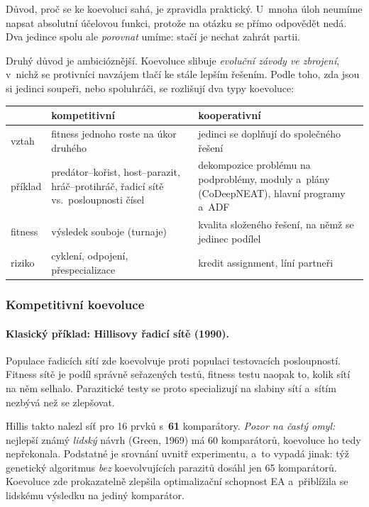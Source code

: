 \documentclass[11pt,a4paper]{article}
\theoremstyle{definition}
\begin{document}
Důvod, proč se ke koevoluci sahá, je zpravidla praktický. U~mnoha úloh neumíme napsat
absolutní účelovou funkci, protože na otázku  se přímo
odpovědět nedá. Dva jedince spolu ale \emph{porovnat} umíme: stačí je nechat zahrát partii.

Druhý důvod je ambicióznější. Koevoluce slibuje \emph{evoluční závody ve zbrojení}, v~nichž
se protivníci navzájem tlačí ke stále lepším řešením. Podle toho, zda jsou si jedinci soupeři,
nebo spoluhráči, se rozlišují dva typy koevoluce:

\begin{center}
\begin{tabular}{@{}p{3cm}p{6cm}p{6cm}@{}}
\toprule
 & \textbf{kompetitivní} & \textbf{kooperativní} \\
\midrule
vztah & fitness jednoho roste na úkor druhého & jedinci se doplňují do
  společného řešení \\
příklad & predátor--kořist, host--parazit, hráč--protihráč, řadicí sítě vs.\
  posloupnosti čísel & dekompozice problému na podproblémy, moduly a~plány
  (CoDeepNEAT), hlavní programy a~ADF \\
fitness & výsledek souboje (turnaje) & kvalita složeného řešení, na němž se
  jedinec podílel \\
riziko & cyklení, odpojení, přespecializace & kredit assignment, líní partneři \\
\bottomrule
\end{tabular}
\end{center}

\subsubsection{Kompetitivní koevoluce}

\paragraph{Klasický příklad: Hillisovy řadicí sítě (1990).} Populace řadicích sítí zde
koevolvuje proti populaci testovacích posloupností. Fitness sítě je podíl správně seřazených
testů, fitness testu naopak to, kolik sítí na něm selhalo. Parazitické testy se proto
specializují na slabiny sítí a~sítím nezbývá než se zlepšovat.

Hillis takto nalezl síť pro 16 prvků s~\textbf{61} komparátory. \emph{Pozor na častý omyl:}
nejlepší známý \emph{lidský} návrh (Green, 1969) má 60 komparátorů, koevoluce ho tedy
nepřekonala. Podstatné je srovnání uvnitř experimentu, a~to vypadá jinak: týž genetický
algoritmus \emph{bez} koevolvujících parazitů dosáhl jen 65 komparátorů. Koevoluce zde
prokazatelně zlepšila optimalizační schopnost EA a~přiblížila se lidskému výsledku na jediný
komparátor.
\end{document}
